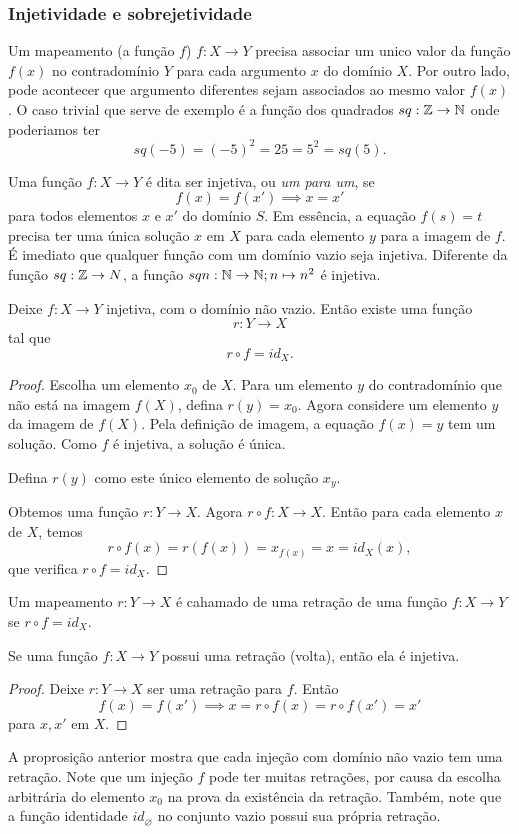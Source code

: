 \subsubsection{Injetividade e sobrejetividade}
Um mapeamento (a função $f$) $f: X \to Y$ precisa associar um unico valor da função $f(x)$ no contradomínio $Y$ para cada argumento $x$ do domínio $X$. Por outro lado, pode acontecer que argumento diferentes sejam associados ao mesmo valor $f(x)$. O caso trivial que serve de exemplo é a função dos quadrados $sq: \mathbb{Z} \to \mathbb{N}$ onde poderiamos ter $$sq(-5) = (-5)^{2} = 25 = 5^{2} = sq(5).$$
\begin{definition}
	Uma função $f: X \to Y$ é dita ser injetiva, ou \emph{um para um}, se $$f(x) = f(x') \implies x = x'$$
  para todos elementos $x$ e $x'$ do domínio $S$.
  Em essência, a equação $f(s) = t$ precisa ter uma única solução $x$ em $X$ para cada elemento $y$ para a imagem de $f$. É imediato que qualquer função com um domínio vazio seja injetiva. Diferente da função $sq: \mathbb{Z} \to N$, a função $sqn: \mathbb{N} \to \mathbb{N}; n \mapsto n^{2}$ é injetiva.
\end{definition}
\begin{stat}
  Deixe $f: X \to Y$ injetiva, com o domínio não vazio. Então existe uma função $$r: Y \to X$$
  tal que $$r \circ f = id_{X}.$$
\end{stat}
\begin{proof}
  Escolha um elemento $x_{0}$ de $X$. Para um elemento $y$ do contradomínio que
  não está na imagem $f(X)$, defina $r(y) = x_{0}$. Agora considere um elemento $y$ da imagem de $f(X)$. Pela definição de imagem, a equação $f(x) = y$ tem um solução. Como $f$ é injetiva, a solução é única. 
  
  Defina $r(y)$ como este único elemento de solução $x_{y}$. 
  
  Obtemos uma função $r: Y \to X$. Agora $r \circ f: X \to X$. Então para cada elemento $x$ de $X$, temos $$r\circ f(x) = r \left(f(x)\right) = x_{f(x)} = x = id_{X}(x),$$ que verifica $r \circ f = id_{X}.$
\end{proof}
\begin{definition}[Retração]
  Um mapeamento $r: Y \to X$ é cahamado de uma retração de uma função $f: X \to Y$ se $r\circ f = id_{X}.$
\end{definition}
\begin{stat}
  Se uma função $f: X \to Y$ possui uma retração (volta), então ela é injetiva.
\end{stat}
\begin{proof}
  Deixe $r: Y \to X$ ser uma retração para $f$. Então $$f(x) = f(x') \implies x=r\circ f(x) = r\circ f(x') = x'$$ para $x,x'$ em $X$.
\end{proof}
A proprosição anterior mostra que cada injeção com domínio não vazio tem uma retração. Note que um injeção $f$ pode ter muitas retrações, por causa da escolha arbitrária do elemento $x_{0}$ na prova da existência da retração. Também, note que a função identidade $id_{\varnothing}$ no conjunto vazio possui sua própria retração.


